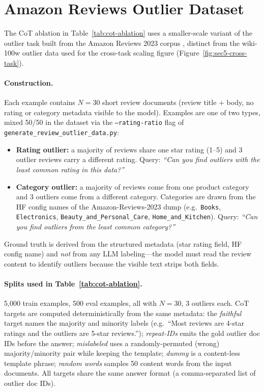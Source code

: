 \section{Amazon Reviews Outlier Dataset}
\label{app:amazon-reviews}

The CoT ablation in Table~\ref{tab:cot-ablation} uses a smaller-scale variant of the outlier task built from the Amazon Reviews 2023 corpus \citep{Hou2024BridgingLA}, distinct from the wiki-100w outlier data used for the cross-task scaling figure (Figure~\ref{fig:sec5-cross-task}).

\paragraph{Construction.} Each example contains $N{=}30$ short review documents (review title + body, no rating or category metadata visible to the model). Examples are one of two types, mixed 50/50 in the dataset via the \texttt{--rating-ratio} flag of \texttt{generate\_review\_outlier\_data.py}:

\begin{itemize}
\item \textbf{Rating outlier:} a majority of reviews share one star rating (1--5) and 3 outlier reviews carry a different rating. Query: \emph{``Can you find outliers with the least common rating in this data?''}
\item \textbf{Category outlier:} a majority of reviews come from one product category and 3 outliers come from a different category. Categories are drawn from the HF config names of the Amazon-Reviews-2023 dump (e.g.\ \texttt{Books}, \texttt{Electronics}, \texttt{Beauty\_and\_Personal\_Care}, \texttt{Home\_and\_Kitchen}). Query: \emph{``Can you find outliers from the least common category?''}
\end{itemize}

Ground truth is derived from the structured metadata (star rating field, HF config name) and \emph{not} from any LLM labeling---the model must read the review content to identify outliers because the visible text strips both fields.

\paragraph{Splits used in Table~\ref{tab:cot-ablation}.} 5{,}000 train examples, 500 eval examples, all with $N{=}30$, 3 outliers each. CoT targets are computed deterministically from the same metadata: the \emph{faithful} target names the majority and minority labels (e.g.\ ``Most reviews are 4-star ratings and the outliers are 5-star reviews.''); \emph{repeat-IDs} emits the gold outlier doc IDs before the answer; \emph{mislabeled} uses a randomly-permuted (wrong) majority/minority pair while keeping the template; \emph{dummy} is a content-less template phrase; \emph{random words} samples 50 content words from the input documents. All targets share the same answer format (a comma-separated list of outlier doc IDs).

